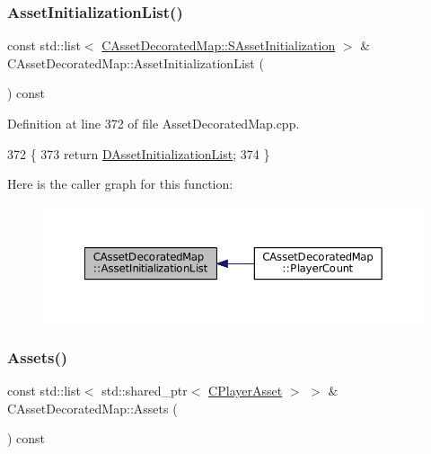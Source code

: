 \subsubsection{\texorpdfstring{Asset\+Initialization\+List()}{AssetInitializationList()}}
{\footnotesize\ttfamily const std\+::list$<$ \hyperlink{structCAssetDecoratedMap_1_1SAssetInitialization}{C\+Asset\+Decorated\+Map\+::\+S\+Asset\+Initialization} $>$ \& C\+Asset\+Decorated\+Map\+::\+Asset\+Initialization\+List (\begin{DoxyParamCaption}{ }\end{DoxyParamCaption}) const}



Definition at line 372 of file Asset\+Decorated\+Map.\+cpp.


\begin{DoxyCode}
372                                                                                                           \{
373     \textcolor{keywordflow}{return} \hyperlink{classCAssetDecoratedMap_a2b7bf2e9a19a9173093cef32048608c2}{DAssetInitializationList};
374 \}
\end{DoxyCode}
Here is the caller graph for this function\+:
\nopagebreak
\begin{figure}[H]
\begin{center}
\leavevmode
\includegraphics[width=350pt]{classCAssetDecoratedMap_aa71f42e162c1d3003248306bfa15e69d_icgraph}
\end{center}
\end{figure}
\hypertarget{classCAssetDecoratedMap_a2f4d2597697593197567877900d55c52}{}\label{classCAssetDecoratedMap_a2f4d2597697593197567877900d55c52} 
\subsubsection{\texorpdfstring{Assets()}{Assets()}}
{\footnotesize\ttfamily const std\+::list$<$ std\+::shared\+\_\+ptr$<$ \hyperlink{classCPlayerAsset}{C\+Player\+Asset} $>$ $>$ \& C\+Asset\+Decorated\+Map\+::\+Assets (\begin{DoxyParamCaption}{ }\end{DoxyParamCaption}) const}



